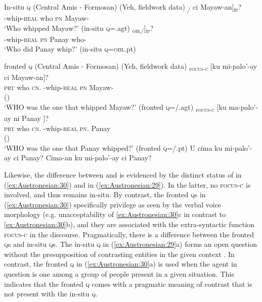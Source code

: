 \documentclass[output=paper,chinesefont]{../langscibook}
\begin{document}
\ea\label{ex:Austronesian:29} In-situ \textsc{q} (Central Amis - Formosan) (Yeh, fieldwork data)
\ea\gll
[Mi-palo'-ay  [\textbf{cima}]\textsubscript{\SUBJ/{\FOC}}  ci   Mayaw-an]\textsubscript{\textsc{ip}}? \\
 \AV-whip-\textsc{real} \phantom{[}who    \textsc{pn} Mayaw-{\LOC} \\
\glt`Who whipped Mayaw?'  (in-situ \textsc{q}=\SUBJ.agt)
\ex\gll
[Mi-palo'-ay ci Panay [\textbf{cima}-an]\textsubscript{\textsc{obl}/\FOC}]\textsubscript{\textsc{ip}}?\\
\AV-whip-\textsc{real} \textsc{pn} Panay \phantom{[}who-{\LOC} \\
\glt`Who did Panay whip?'  (in-situ \textsc{q}=\textsc{obl}.pt)
\z\z

\ea\label{ex:Austronesian:30} fronted \textsc{q} (Central Amis - Formosan) (Yeh, fieldwork data)
\ea{}\textsubscript{\textsc{focus-c}} [ku   mi-palo'-ay    {\GAP} ci   Mayaw-an]\textsubscript{\COMP}?\\
\phantom{[}\textsc{prt} who  \phantom{[}\textsc{cn}.{\ABS} \AV-whip-\textsc{real} {\SUBJ} \textsc{pn} Mayaw-{\LOC}\\
(\PIVOT)   \\
\glt`WHO was the one that whipped Mayaw?' (fronted \textsc{q}=\SUBJ/\PIVOT.agt)
\ex{}\textsubscript{\textsc{focus-c}} [ku ma-palo'-ay  ni    Panay  {\GAP}]\textsubscript{\COMP}?\\
\phantom{[}\textsc{prt} who  \phantom{[}\textsc{cn}.{\ABS} \PV-whip-\textsc{real} \textsc{pn}.{\GEN} Panay \SUBJ\\
(\PIVOT)   \\
\glt`WHO was the one that Panay whipped?' (fronted \textsc{q}=\SUBJ/\PIVOT.pt)
\ex * U cima ku mi-palo'-ay ci Panay?
\ex * Cima-an ku mi-palo'-ay ci Panay?
\z\z

Likewise, the difference between \SUBJ and \PIVOT is evidenced by the distinct status of \SUBJ\PIVOT in (\ref{ex:Austronesian:30}) and \SUBJ in (\ref{ex:Austronesian:29}). In the latter, no \textsc{focus-c} is involved, and thus \SUBJ remains in-situ. By contrast, the fronted \textsc{q}s in (\ref{ex:Austronesian:30}) specifically privilege \SUBJ\PIVOT as seen by the verbal voice morphology (e.g. unacceptability of \ref{ex:Austronesian:30}c in contrast to \ref{ex:Austronesian:30}b), and they are associated with the extra-syntactic function \textsc{focus-c} in the discourse. Pragmatically, there is a difference between the fronted \textsc{q}s and in-situ \textsc{q}s. The in-situ \textsc{q} in (\ref{ex:Austronesian:29}a) forms an open question without the presupposition of contrasting entities in the given context \citep[348]{Wei2009}. In contrast, the fronted \textsc{q} in (\ref{ex:Austronesian:30}a) is used when the \SUBJ agent in question is one among a group of people present in a given situation. This indicates that the fronted \textsc{q} comes with a pragmatic meaning of contrast that is not present with the in-situ \textsc{q}.
\end{document}
